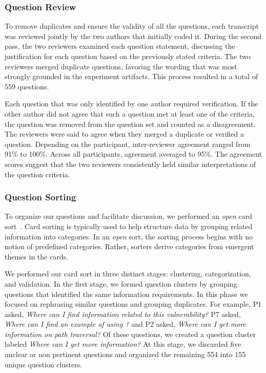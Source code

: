 \documentclass{acm_proc_article-sp}
\begin{document}
\subsubsection{Question Review}
To remove duplicates and ensure the validity of all the questions, each transcript was reviewed jointly by the two authors that initially coded it.
During the second pass, the two reviewers examined each question statement, discussing the justification for each question based on the previously stated criteria.
The two reviewers merged duplicate questions, favoring the wording that was most strongly grounded in the experiment artifacts.
This process resulted in a total of 559 questions.

Each question that was only identified by one author required verification.
If the other author did not agree that such a question met at least one of the criteria, the question was removed from the question set and counted as a disagreement.
The reviewers were said to agree when they merged a duplicate or verified a question. Depending on the participant, inter-reviewer agreement ranged from 91\% to 100\%. Across all participants, agreement averaged to 95\%.
The agreement scores suggest that the two reviewers consistently held similar interpretations of the question criteria.

\subsubsection{Question Sorting}
To organize our questions and facilitate discussion, we performed an \textit{open} card sort~\cite{hudson2013sorting}. 
Card sorting is typically used to help structure data by grouping related information into categories. 
In an \textit{open} sort, the sorting process begins with no notion of predefined categories. 
Rather, sorters derive categories from emergent themes in the cards. 

We performed our card sort in three distinct stages: clustering, categorization, and validation.
In the first stage, we formed question clusters by grouping questions that identified the same information requirements. 
In this phase we focused on rephrasing similar questions and grouping duplicates.
For example, P1 asked, \textit{Where can I find information related to this vulnerability?} P7 asked, \textit{Where can I find an example of using ?} and P2 asked, \textit{Where can I get more information on path traversal?} 
Of these questions, we created a question cluster labeled \textit{Where can I get more information?}
At this stage, we discarded five unclear or non pertinent questions and organized the remaining 554 into 155 unique question clusters.
\end{document}
